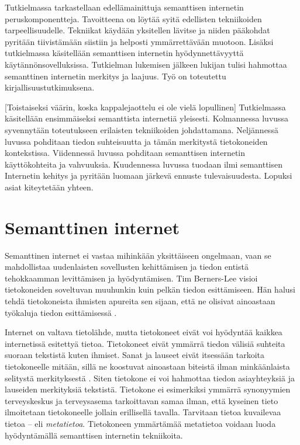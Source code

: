 \documentclass[finnish, 12pt, a4paper, elec, utf8, pdfa, online]{aaltothesis}
\begin{document}
Tutkielmassa tarkastellaan edellämainittuja semanttisen internetin peruskomponentteja. Tavoitteena on löytää syitä edellisten tekniikoiden tarpeellisuudelle. Tekniikat käydään yksitellen lävitse ja niiden pääkohdat pyritään tiivistämään siistiin ja helposti ymmärrettävään muotoon. Lisäksi tutkielmassa käsitellään semanttisen internetin hyödynnettävyyttä käytännönsovelluksissa. Tutkielman lukemisen jälkeen lukijan tulisi hahmottaa semanttinen internetin merkitys ja laajuus. Työ on toteutettu kirjallisuustutkimuksena.

[Toistaiseksi väärin, koska kappalejaottelu ei ole vielä lopullinen]
Tutkielmassa käsitellään ensimmäiseksi semanttista internetiä yleisesti. Kolmannessa luvussa syvennytään toteutukseen erilaisten tekniikoiden johdattamana. Neljännessä luvussa pohditaan tiedon suhteisuutta ja tämän merkitystä tietokoneiden kontekstissa. Viidennessä luvussa pohditaan semanttisen internetin käyttökohteita ja vahvuuksia. Kuudennessa luvussa tuodaan ilmi semanttisen Internetin kehitys ja pyritään luomaan järkevä ennuste tulevaisuudesta. Lopuksi asiat kiteytetään yhteen.

\clearpage %
\section{Semanttinen internet}

Semanttinen internet ei vastaa mihinkään yksittäiseen ongelmaan, vaan se mahdollistaa uudenlaisten sovellusten kehittämisen ja tiedon entistä tehokkaamman levittämisen ja hyödyntämisen. Tim Berners-Lee visioi tietokoneiden soveltuvan muuhunkin kuin pelkän tiedon esittämiseen. Hän halusi tehdä tietokoneista ihmisten apureita sen sijaan, että ne olisivat ainoastaan työkaluja tiedon esittämisessä \cite{Berners_visio}.

Internet on valtava tietolähde, mutta tietokoneet eivät voi hyödyntää kaikkea internetissä esitettyä tietoa. Tietokoneet eivät ymmärrä tiedon välisiä suhteita suoraan tekstistä kuten ihmiset. Sanat ja lauseet eivät itsessään tarkoita tietokoneelle mitään, sillä ne koostuvat ainoastaan biteistä ilman minkäänlaista selitystä merkityksestä \cite{ASCII}. Siten tietokone ei voi hahmottaa tiedon asiayhteyksiä ja lauseiden merkityksiä tekstistä. Tietokone ei esimerkiksi ymmärrä synonyymien terveyskeskus ja terveysasema tarkoittavan samaa ilman, että kyseinen tieto ilmoitetaan tietokoneelle jollain erillisellä tavalla. Tarvitaan tietoa kuvailevaa tietoa -- eli \textit{metatietoa}. Tietokoneen ymmärtämää metatietoa voidaan luoda hyödyntämällä semanttisen internetin tekniikoita.
\end{document}
